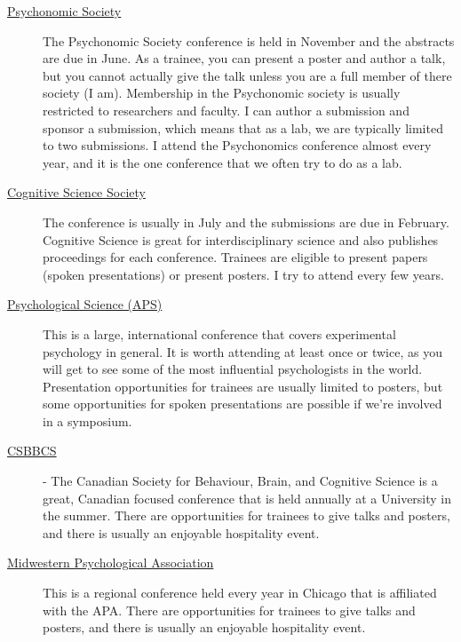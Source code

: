 \documentclass{article}
\begin{document}
\begin{description}
\item [\href{http://www.psychonomic.org}{Psychonomic Society} ] The Psychonomic Society conference is held in November and the abstracts are due in June. As a trainee, you can present a poster and author a talk, but you cannot actually give the talk unless you are a full member of there society (I am). Membership in the Psychonomic society is usually restricted to researchers and faculty. I can author a submission and sponsor a submission, which means that as a lab, we are typically limited to two submissions. I attend the Psychonomics conference almost every year, and it is the one conference that we often try to do as a lab.

\item [\href{http://www.cognitivesciencesociety.org/}{Cognitive Science Society}] The conference is usually in July and the submissions are due in February. Cognitive Science is great for interdisciplinary science and also publishes proceedings for each conference. Trainees are eligible to present papers (spoken presentations) or present posters. I try to attend every few years.

\item  [\href{http://www.psychologicalscience.org/conventions/annual}{Psychological Science (APS)}] This is a large, international conference that covers experimental psychology in general. It is worth attending at least once or twice, as you will get to see some of the most influential psychologists in the world. Presentation opportunities for trainees are usually limited to posters, but some opportunities for spoken presentations are possible if we're involved in a symposium.

\item [\href{https://www.csbbcs.org/}{CSBBCS}] - The Canadian Society for Behaviour, Brain, and Cognitive Science is a great, Canadian focused conference that is held annually at a University in the summer. There are opportunities for trainees to give talks and posters, and there is usually an enjoyable hospitality event. 

\item [\href{https://www.midwesternpsych.org/}{Midwestern Psychological Association}] This is a regional conference held every year in Chicago that is affiliated with the APA. There are opportunities for trainees to give talks and posters, and there is usually an enjoyable hospitality event. 

\end{description}
\end{document}
